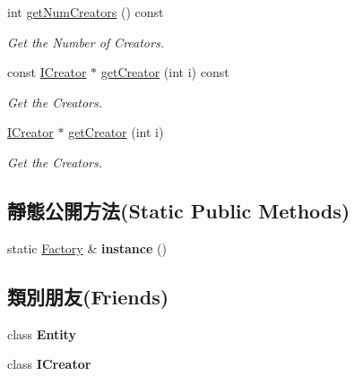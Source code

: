 \begin{DoxyCompactItemize}
int \hyperlink{class_magnum_1_1_entity_1_1_factory_aa0df0ff18a2253daaf5a9542e7c211d9}{get\+Num\+Creators} () const 
\begin{DoxyCompactList}\small\item\em Get the Number of Creators. \end{DoxyCompactList}\item 
const \hyperlink{class_magnum_1_1_entity_1_1_i_creator}{I\+Creator} $\ast$ \hyperlink{class_magnum_1_1_entity_1_1_factory_a77214e9240de96dc15ac4b17cff90905}{get\+Creator} (int i) const 
\begin{DoxyCompactList}\small\item\em Get the Creators. \end{DoxyCompactList}\item 
\hyperlink{class_magnum_1_1_entity_1_1_i_creator}{I\+Creator} $\ast$ \hyperlink{class_magnum_1_1_entity_1_1_factory_aba98c9dfb45cb78f8c5430d27682c7fd}{get\+Creator} (int i)
\begin{DoxyCompactList}\small\item\em Get the Creators. \end{DoxyCompactList}\end{DoxyCompactItemize}
\subsection*{靜態公開方法(Static Public Methods)}
\begin{DoxyCompactItemize}
\item 
static \hyperlink{class_magnum_1_1_entity_1_1_factory}{Factory} \& {\bfseries instance} ()\hypertarget{class_magnum_1_1_entity_1_1_factory_ae0bfdc4b2ce5f66204595dcac9ce1c36}{}\label{class_magnum_1_1_entity_1_1_factory_ae0bfdc4b2ce5f66204595dcac9ce1c36}

\end{DoxyCompactItemize}
\subsection*{類別朋友(Friends)}
\begin{DoxyCompactItemize}
\item 
class {\bfseries Entity}\hypertarget{class_magnum_1_1_entity_1_1_factory_a614439ccac0344926adc4c0165d64060}{}\label{class_magnum_1_1_entity_1_1_factory_a614439ccac0344926adc4c0165d64060}

\item 
class {\bfseries I\+Creator}\hypertarget{class_magnum_1_1_entity_1_1_factory_a6d6e56ac47edfce9d2590e0757222ded}{}\label{class_magnum_1_1_entity_1_1_factory_a6d6e56ac47edfce9d2590e0757222ded}

\end{DoxyCompactItemize}


